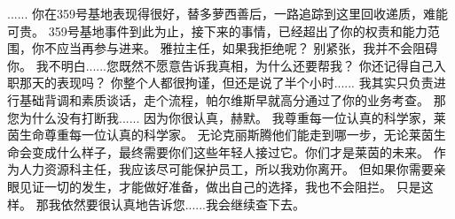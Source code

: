 \documentclass[openany]{book}
\begin{document}
\begin{dialogue}
     ......
     你在359号基地表现得很好，替多萝西善后，一路追踪到这里回收递质，难能可贵。
     359号基地事件到此为止，接下来的事情，已经超出了你的权责和能力范围，你不应当再参与进来。
     雅拉主任，如果我拒绝呢？
     别紧张，我并不会阻碍你。
     我不明白......您既然不愿意告诉我真相，为什么还要帮我？
     你还记得自己入职那天的表现吗？
     你整个人都很拘谨，但还是说了半个小时......
     我其实只负责进行基础背调和素质谈话，走个流程，帕尔维斯早就高分通过了你的业务考查。
     那您为什么没有打断我......
     因为你很认真，赫默。
     我尊重每一位认真的科学家，莱茵生命尊重每一位认真的科学家。
     无论克丽斯腾他们能走到哪一步，无论莱茵生命会变成什么样子，最终需要你们这些年轻人接过它。你们才是莱茵的未来。
     作为人力资源科主任，我应该尽可能保护员工，所以我劝你离开。
     但如果你需要亲眼见证一切的发生，才能做好准备，做出自己的选择，我也不会阻拦。
     只是这样。
     那我依然要很认真地告诉您......我会继续查下去。
\end{dialogue}
\end{document}
